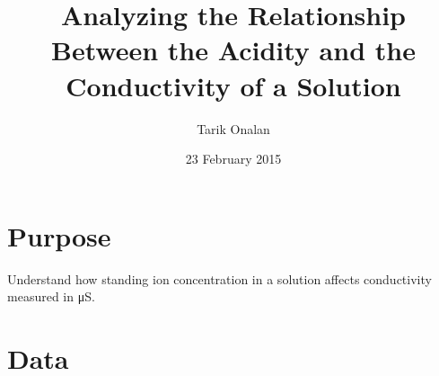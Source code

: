 \documentclass[a4paper]{article}
\title{Analyzing the Relationship Between the Acidity and the Conductivity of a Solution}
\date{23 February 2015}
\author{Tarik Onalan}
\begin{document}
    \maketitle
    \section{Purpose}
        Understand how standing  ion concentration in a solution affects conductivity
        measured in \si{\micro\siemens}.
    \section{Data}
        
\end{document}
